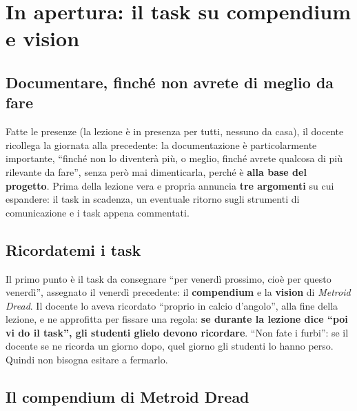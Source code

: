 \section{In apertura: il task su compendium e vision}
\label{gd10:sec:apertura}

\subsection{Documentare, finché non avrete di meglio da fare}

Fatte le presenze (la lezione è in presenza per tutti, nessuno da casa), il
docente ricollega la giornata alla precedente: la documentazione è
particolarmente importante, ``finché non lo diventerà più, o meglio, finché
avrete qualcosa di più rilevante da fare'', senza però mai dimenticarla,
perché è \textbf{alla base del progetto}. Prima della lezione vera e propria
annuncia \textbf{tre argomenti} su cui espandere: il task in scadenza, un
eventuale ritorno sugli strumenti di comunicazione e i task appena
commentati.

\subsection{Ricordatemi i task}

Il primo punto è il task da consegnare ``per venerdì prossimo, cioè per
questo venerdì'', assegnato il venerdì precedente: il \textbf{compendium} e
la \textbf{vision} di \emph{Metroid Dread}. Il docente lo aveva ricordato
``proprio in calcio d'angolo'', alla fine della lezione, e ne approfitta per
fissare una regola: \textbf{se durante la lezione dice ``poi vi do il task'',
gli studenti glielo devono ricordare}. ``Non fate i furbi'': se il docente se
ne ricorda un giorno dopo, quel giorno gli studenti lo hanno perso. Quindi
non bisogna esitare a fermarlo.

\subsection{Il compendium di Metroid Dread}

